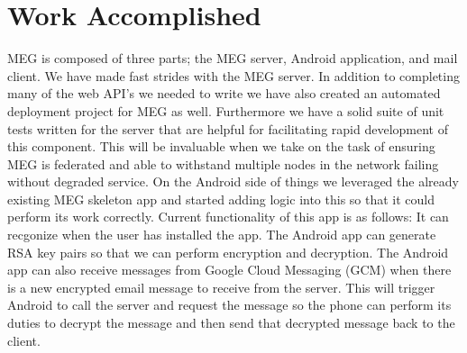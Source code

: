 \documentclass{article}
\begin{document}
\section{Work Accomplished}
\par MEG is composed of three parts; the MEG server, Android application, and mail client. We have made fast strides with the MEG server. In addition to completing many of the web API's we needed to write we have also created an automated deployment project for MEG as well. Furthermore we have a solid suite of unit tests written for the server that are helpful for facilitating rapid development of this component. This will be invaluable when we take on the task of ensuring MEG is federated and able to withstand multiple nodes in the network failing without degraded service. On the Android side of things we leveraged the already existing MEG skeleton app and started adding logic into this so that it could perform its work correctly. Current functionality of this app is as follows: It can recgonize when the user has installed the app. The Android app can generate RSA key pairs so that we can perform encryption and decryption. The Android app can also receive messages from Google Cloud Messaging (GCM) when there is a new encrypted email message to receive from the server. This will trigger Android to call the server and request the message so the phone can perform its duties to decrypt the message and then send that decrypted message back to the client.
\end{document}
